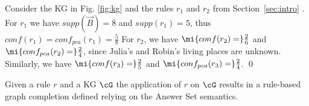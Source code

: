 \begin{example}
Consider the KG in Fig. \ref{fig:kg} and the rules $r_1$ and $r_2$ from Section~\ref{sec:intro}%
. For $r_1$ we have $supp(\vec{B})=8$ and
$supp(r_1) = 5$, thus %
$conf(r_1) = conf_{pca}(r_1)=\frac{5}{8}$ %
For $r_2$, we have $\mi{conf(r_2) =} \frac{2}{6}$ and $\mi{conf_{pca}(r_2) =}\frac{2}{4}$, since Julia's and Robin's living places are unknown. Similarly, we have $\mi{conf(r_3) =} \frac{2}{5}$ and $\mi{conf_{pca}(r_3) =}\frac{2}{4}$.
\qed
\end{example}

Given a rule $r$ and a KG $\cG$ the application of $r$ on $\cG$ results in a rule-based graph completion defined relying on the Answer Set semantics.




